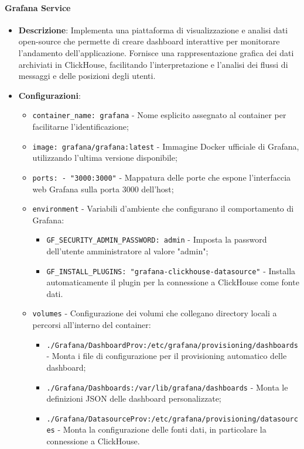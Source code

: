 \documentclass[10pt]{article}
\begin{document}
        \paragraph{Grafana Service}
        \begin{itemize} 
        \item \textbf{Descrizione}: Implementa una piattaforma di visualizzazione e analisi dati open-source che permette di creare dashboard interattive per monitorare l'andamento dell'applicazione. Fornisce una rappresentazione grafica dei dati archiviati in ClickHouse, facilitando l'interpretazione e l'analisi dei flussi di messaggi e delle posizioni degli utenti.
        \item \textbf{Configurazioni}:
        \begin{itemize}
            \item \texttt{container\_name: grafana} - Nome esplicito assegnato al container per facilitarne l'identificazione;
            \item \texttt{image: grafana/grafana:latest} - Immagine Docker ufficiale di Grafana, utilizzando l'ultima versione disponibile;
            \item \texttt{ports: - "3000:3000"} - Mappatura delle porte che espone l'interfaccia web Grafana sulla porta 3000 dell'host;
            \item \texttt{environment} - Variabili d'ambiente che configurano il comportamento di Grafana:
            \begin{itemize}
                \item \texttt{GF\_SECURITY\_ADMIN\_PASSWORD: admin} - Imposta la password dell'utente amministratore al valore "admin";
                \item \texttt{GF\_INSTALL\_PLUGINS: "grafana-clickhouse-datasource"} - Installa automaticamente il plugin per la connessione a ClickHouse come fonte dati.
            \end{itemize}
            \item \texttt{volumes} - Configurazione dei volumi che collegano directory locali a percorsi all'interno del container:
            \begin{itemize}
                \item \texttt{./Grafana/DashboardProv:/etc/grafana/provisioning/dashboards} - Monta i file di configurazione per il provisioning automatico delle dashboard;
                \item \texttt{./Grafana/Dashboards:/var/lib/grafana/dashboards} - Monta le definizioni JSON delle dashboard personalizzate;
                \item \texttt{./Grafana/DatasourceProv:/etc/grafana/provisioning/datasources} - Monta la configurazione delle fonti dati, in particolare la connessione a ClickHouse.
            \end{itemize}
        \end{itemize}
        

\end{itemize}
\end{document}
